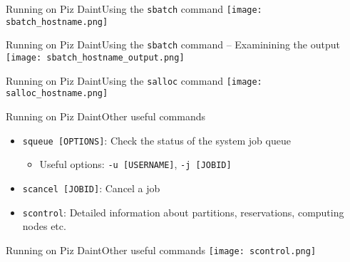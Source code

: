 \begin{frame}[fragile]{Running on Piz Daint}{Using the \texttt{sbatch} command}
  {
    \centering
    \texttt{[image: sbatch\_hostname.png]}
  }
\end{frame}


\begin{frame}[fragile]{Running on Piz Daint}{Using the \texttt{sbatch} command -- Examinining the output}
  {
    \centering
    \texttt{[image: sbatch\_hostname\_output.png]}
  }
\end{frame}

\begin{frame}[fragile]{Running on Piz Daint}{Using the \texttt{salloc} command}
  {
    \centering
    \texttt{[image: salloc\_hostname.png]}
  }
\end{frame}

\begin{frame}{Running on Piz Daint}{Other useful commands}
  \begin{itemize}
  \item \texttt{squeue [OPTIONS]}: Check the status of the system job queue
    \begin{itemize}
    \item Useful options: \texttt{-u [USERNAME]}, \texttt{-j [JOBID]}
    \end{itemize}
  \item \texttt{scancel [JOBID]}: Cancel a job
  \item \texttt{scontrol}: Detailed information about partitions, reservations,
    computing nodes etc.
  \end{itemize}
\end{frame}

\begin{frame}{Running on Piz Daint}{Other useful commands}
  {
    \centering
    \texttt{[image: scontrol.png]}
  }
\end{frame}

